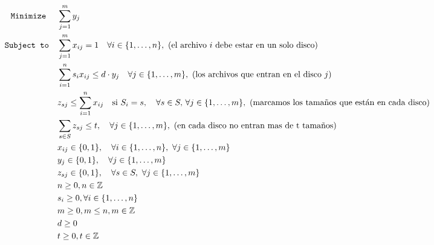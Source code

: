 \begin{alignat*}{2}
	\minimize
	& \sum_{j = 1}^{m} y_{j}\\
	\subjto
	& \sum_{j = 1}^{m} x_{ij} = 1 \quad \forall i \in \{1, \ldots, n\},\ \text{(el archivo $i$ debe estar en un solo disco)}\\
	& \sum_{i = 1}^{n} s_{i} x_{ij} \le d\cdot y_{j} \quad \forall j \in \{1, \ldots, m\},\ \text{(los archivos que entran en el disco $j$)}\\
        & z_{sj} \leq \sum_{i=1}^{n} x_{ij} \quad \text{si } S_i = s, \quad \forall s \in S, \, \forall j \in \{1, \ldots, m\},\ \text{(marcamos los tamaños que están en cada disco)} \\
        & \sum_{s \in S} z_{sj} \leq t, \quad \forall j \in \{1, \ldots, m\},\ \text{(en cada disco no entran mas de t tamaños)} \\
	& x_{ij} \in \{0,1\}, \quad \forall i \in \{1, \ldots, n\}, \ \forall j \in \{1, \ldots, m\}\\
	& y_{j} \in \{0,1\}, \quad \forall j \in \{1, \ldots, m\} \\
        & z_{sj} \in \{0,1\}, \quad \forall s \in S, \ \forall j \in \{1, \ldots, m\}\\
        & n \geq  0, n \in \mathbb{Z} \\
        & s_i \geq 0, \forall i \in \{1, \ldots, n\}\\
        & m \geq  0, m \leq  n, m \in \mathbb{Z} \\
        & d \geq  0 \\
        & t \geq  0, t \in \mathbb{Z} \\
\end{alignat*}


